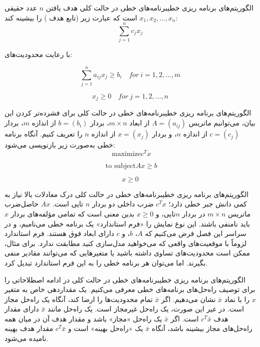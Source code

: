 \begin{itemframe-s}{الگوریتم‌های برنامه ریزی خطی}{برنامه‌های خطی در حالت کلی}
\itm
هدف یافتن $n$ عدد حقیقی
$x_1, x_2, \dots, x_n$
است که عبارت زیر (تابع هدف
) را بیشینه کند:
$$
\sum_{j=1}^{n} c_j x_j
$$

با رعایت محدودیت‌های:

$$
\sum_{j=1}^{n} a_{ij} x_j \ge b_i \quad for \:  i = 1, 2, \dots, m
$$

$$
x_j \ge 0 \quad for \: j = 1, 2, \dots, n
$$
\end{itemframe-s}


\begin{itemframe-s}{الگوریتم‌های برنامه ریزی خطی}{برنامه‌های خطی در حالت کلی}
\itm
برای فشرده‌تر کردن این بیان، می‌توانیم ماتریس
$A = (a_{ij})$
از ابعاد
$m \times n$،
بردار $b = (b_i)$ از اندازه $m$،
بردار $c = (c_j)$ از اندازه $n$،
و بردار $x = (x_j)$ از اندازه $n$ را تعریف کنیم.
آنگاه برنامه خطی به‌صورت زیر بازنویسی می‌شود:
$$
\text{  maximize} c^T x
$$

$$
\text{  to subject} Ax \ge b
$$

$$
x \ge 0
$$
\end{itemframe-s}


\begin{itemframe-s}{الگوریتم‌های برنامه ریزی خطی}{برنامه‌های خطی در حالت کلی}
\itm
درک معادلات بالا نیاز به کمی دانش جبر خطی دارد؛
$c^T x$
ضرب داخلی دو بردار $n$ تایی است.
$Ax$
حاصل‌ضرب ماتریس
$m \times n$
در بردار $n$تایی، و
$x \ge 0$
بدین معنی است که تمامی مؤلفه‌های بردار $x$ باید نامنفی باشند.
\itm
این نوع نمایش را «فرم استاندارد»
یک برنامه خطی می‌نامیم، و در سراسر این فصل فرض می‌کنیم که $A$، $b$، و $c$ دارای ابعاد فوق هستند.
\itm
فرم استاندارد لزوماً با موقعیت‌های واقعی که می‌خواهید مدل‌سازی کنید مطابقت ندارد. برای مثال، ممکن است محدودیت‌های تساوی داشته باشید یا متغیرهایی که می‌توانند مقادیر منفی بگیرند. اما می‌توان هر برنامه خطی را به این فرم استاندارد تبدیل کرد.

\end{itemframe-s}


\begin{itemframe-s}{الگوریتم‌های برنامه ریزی خطی}{برنامه‌های خطی در حالت کلی}
\itm
در ادامه اصطلاحاتی را برای توصیف راه‌حل‌های برنامه‌های خطی معرفی می‌کنیم. یک مقداردهی خاص به متغیر
$x$
را با نماد
$\bar{x}$
نشان می‌دهیم. اگر
$\bar{x}$
تمام محدودیت‌ها را ارضا کند، آنگاه یک راه‌حل مجاز
است. در غیر این صورت، یک راه‌حل غیرمجاز
است.
\itm
یک راه‌حل مانند
$\bar{x}$
دارای مقدار هدف
$c^T \bar{x}$
است. اگر
$\bar{x}$
یک راه‌حل «مجاز» باشد و مقدار هدف آن در میان همه راه‌حل‌های مجاز بیشینه باشد، آنگاه
$\bar{x}$
یک «راه‌حل بهینه»
است و
$c^T \bar{x}$
مقدار هدف بهینه
نامیده می‌شود.
\end{itemframe-s}


